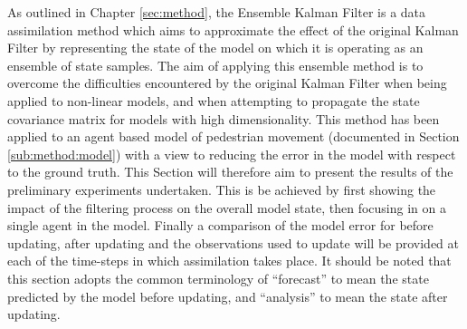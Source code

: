 
As outlined in Chapter \ref{sec:method}, the Ensemble Kalman Filter is a data
assimilation method which aims to approximate the effect of the original Kalman
Filter by representing the state of the model on which it is operating as an
ensemble of state samples.
The aim of applying this ensemble method is to overcome the difficulties
encountered by the original Kalman Filter when being applied to non-linear
models, and when attempting to propagate the state covariance matrix for models
with high dimensionality.
This method has been applied to an agent based model of pedestrian movement
(documented in Section \ref{sub:method:model}) with a view to reducing the error
in the model with respect to the ground truth.
This Section will therefore aim to present the results of the preliminary
experiments undertaken.
This is be achieved by first showing the impact of the filtering process on the
overall model state, then focusing in on a single agent in the model.
Finally a comparison of the model error for before updating, after updating and
the observations used to update will be provided at each of the time-steps in
which assimilation takes place.
It should be noted that this section adopts the common terminology of
``forecast'' to mean the state predicted by the model before updating, and
``analysis'' to mean the state after updating.


